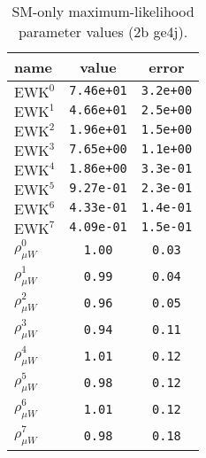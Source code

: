 \documentclass{article}
\begin{document}
\begin{table}\centering
\caption{SM-only maximum-likelihood parameter values (2b ge4j).}
\label{tab:mlParameterValues2b_ge4j}
\begin{tabular}{lcc}name & value & error \\ \hline
$\mathrm{EWK}^{0}$ & {\tt  7.46e+01} & {\tt  3.2e+00}\\
$\mathrm{EWK}^{1}$ & {\tt  4.66e+01} & {\tt  2.5e+00}\\
$\mathrm{EWK}^{2}$ & {\tt  1.96e+01} & {\tt  1.5e+00}\\
$\mathrm{EWK}^{3}$ & {\tt  7.65e+00} & {\tt  1.1e+00}\\
$\mathrm{EWK}^{4}$ & {\tt  1.86e+00} & {\tt  3.3e-01}\\
$\mathrm{EWK}^{5}$ & {\tt  9.27e-01} & {\tt  2.3e-01}\\
$\mathrm{EWK}^{6}$ & {\tt  4.33e-01} & {\tt  1.4e-01}\\
$\mathrm{EWK}^{7}$ & {\tt  4.09e-01} & {\tt  1.5e-01}\\
$\rho_{\mu W}^{0}$ & {\tt 1.00} & {\tt 0.03}\\
$\rho_{\mu W}^{1}$ & {\tt 0.99} & {\tt 0.04}\\
$\rho_{\mu W}^{2}$ & {\tt 0.96} & {\tt 0.05}\\
$\rho_{\mu W}^{3}$ & {\tt 0.94} & {\tt 0.11}\\
$\rho_{\mu W}^{4}$ & {\tt 1.01} & {\tt 0.12}\\
$\rho_{\mu W}^{5}$ & {\tt 0.98} & {\tt 0.12}\\
$\rho_{\mu W}^{6}$ & {\tt 1.01} & {\tt 0.12}\\
$\rho_{\mu W}^{7}$ & {\tt 0.98} & {\tt 0.18}\\
\hline
\end{tabular}
\end{table}
\end{document}
